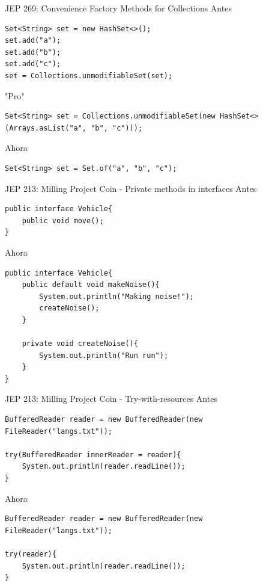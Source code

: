 \documentclass[aspectratio=169]{beamer}
\begin{document}
\begin{frame}[fragile]{JEP 269: Convenience Factory Methods for Collections}
Antes
\begin{lstlisting}
Set<String> set = new HashSet<>();
set.add("a");
set.add("b");
set.add("c");
set = Collections.unmodifiableSet(set);
\end{lstlisting}	

"Pro"
\begin{lstlisting}
Set<String> set = Collections.unmodifiableSet(new HashSet<>(Arrays.asList("a", "b", "c")));
\end{lstlisting}	

Ahora
\begin{lstlisting}
Set<String> set = Set.of("a", "b", "c");
\end{lstlisting}
\end{frame}


\begin{frame}[fragile]{JEP 213: Milling Project Coin - Private methods in interfaces}
Antes
\begin{lstlisting}
public interface Vehicle{
    public void move();
}
\end{lstlisting}	

Ahora
\begin{lstlisting}[basicstyle=\scriptsize]
public interface Vehicle{
    public default void makeNoise(){
        System.out.println("Making noise!");
        createNoise();
    }

    private void createNoise(){
        System.out.println("Run run");
    } 
}
\end{lstlisting}	
    
\end{frame}

\begin{frame}[fragile]{JEP 213: Milling Project Coin - Try-with-resources}
Antes
\begin{lstlisting}
BufferedReader reader = new BufferedReader(new FileReader("langs.txt"));

try(BufferedReader innerReader = reader){
    System.out.println(reader.readLine());
}
\end{lstlisting}	

Ahora
\begin{lstlisting}
BufferedReader reader = new BufferedReader(new FileReader("langs.txt"));

try(reader){
    System.out.println(reader.readLine());
}
\end{lstlisting}	
    
\end{frame}
\end{document}
